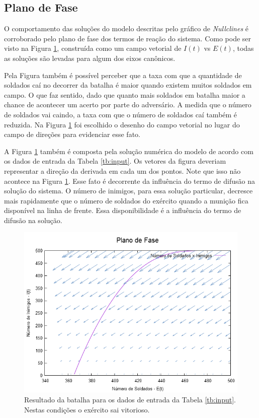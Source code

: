 \documentclass{article}
\begin{document}
\subsection{Plano de Fase}

O comportamento das soluções do modelo descritas pelo gráfico de \textit{Nullclines} é corroborado pelo plano de fase dos termos de reação do sistema. Como pode ser visto na Figura \ref{fig:phase-plane}, construída como um campo vetorial de $I(t)$ vs $E(t)$, todas as soluções são levadas para algum dos eixos canônicos.

Pela Figura também é possível perceber que a taxa com que a quantidade de soldados caí no decorrer da batalha é maior quando existem muitos soldados em campo. O que faz sentido, dado que quanto mais soldados em batalha maior a chance de acontecer um acerto por parte do adversário. A medida que o número de soldados vai caindo, a taxa com que o número de soldados caí também é reduzida. Na Figura \ref{fig:phase-plane} foi escolhido o desenho do campo vetorial no lugar do campo de direções para evidenciar esse fato.

A Figura \ref{fig:phase-plane} também é composta pela solução numérica do modelo de acordo com os dados de entrada da Tabela \ref{tb:input}. Os vetores da figura deveriam representar a direção da derivada em cada um dos pontos. Note que isso não acontece na Figura \ref{fig:phase-plane}. Esse fato é decorrente da influência do termo de difusão na solução do sistema. O número de inimigos, para essa solução particular, decresce mais rapidamente que o número de soldados do exército quando a munição fica disponível na linha de frente. Essa disponibilidade é a influência do termo de difusão na solução.

\begin{figure}[ht]
	\centering
	\includegraphics[scale=0.4]{figs/battle_phase_plane.png}
	\caption{Resultado da batalha para os dados de entrada da Tabela \ref{tb:input}. Nestas condições o exército sai vitorioso.}
	\label{fig:phase-plane}
\end{figure}
\end{document}

